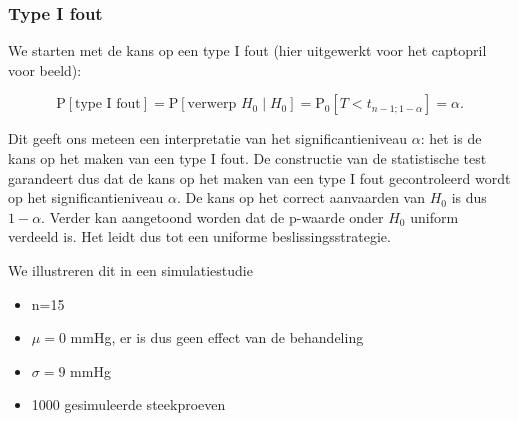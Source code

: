 \documentclass[
  12pt,dutch]{book}
\newenvironment{Shaded}{\begin{snugshade}}{\end{snugshade}}
\newcommand{\AttributeTok}[1]{\textcolor[rgb]{0.13,0.29,0.53}{#1}}
\newcommand{\CommentTok}[1]{\textcolor[rgb]{0.56,0.35,0.01}{\textit{#1}}}
\newcommand{\ControlFlowTok}[1]{\textcolor[rgb]{0.13,0.29,0.53}{\textbf{#1}}}
\newcommand{\DecValTok}[1]{\textcolor[rgb]{0.00,0.00,0.81}{#1}}
\newcommand{\FloatTok}[1]{\textcolor[rgb]{0.00,0.00,0.81}{#1}}
\newcommand{\FunctionTok}[1]{\textcolor[rgb]{0.13,0.29,0.53}{\textbf{#1}}}
\newcommand{\NormalTok}[1]{#1}
\newcommand{\OtherTok}[1]{\textcolor[rgb]{0.56,0.35,0.01}{#1}}
\newcommand{\SpecialCharTok}[1]{\textcolor[rgb]{0.81,0.36,0.00}{\textbf{#1}}}
\newcommand{\StringTok}[1]{\textcolor[rgb]{0.31,0.60,0.02}{#1}}
\providecommand{\tightlist}{%
  \setlength{\itemsep}{0pt}\setlength{\parskip}{0pt}}
\theoremstyle{definition}
\theoremstyle{definition}
\theoremstyle{definition}
\theoremstyle{definition}
\theoremstyle{remark}
\begin{document}
\subsubsection{Type I fout}\label{type-i-fout}

We starten met de kans op een type I fout (hier uitgewerkt voor het captopril voor beeld):

\[\text{P}\left[\text{type I fout}\right]=\text{P}\left[\text{verwerp }H_0 \mid H_0\right] = \text{P}_0\left[T<t_{n-1;1-\alpha}\right]=\alpha.\]

Dit geeft ons meteen een interpretatie van het significantieniveau \(\alpha\): het is de kans op het maken van een type I fout. De constructie van de statistische test garandeert dus dat de kans op het maken van een type I fout gecontroleerd wordt op het significantieniveau \(\alpha\). De kans op het correct aanvaarden van \(H_0\) is dus \(1-\alpha\).
Verder kan aangetoond worden dat de p-waarde onder \(H_0\) uniform verdeeld is. Het leidt dus tot een uniforme beslissingsstrategie.

We illustreren dit in een simulatiestudie

\begin{itemize}
\tightlist
\item
  n=15
\item
  \(\mu=0\) mmHg, er is dus geen effect van de behandeling
\item
  \(\sigma =9\) mmHg
\item
  1000 gesimuleerde steekproeven
\end{itemize}

\begin{Shaded}
\end{Shaded}
\end{document}
